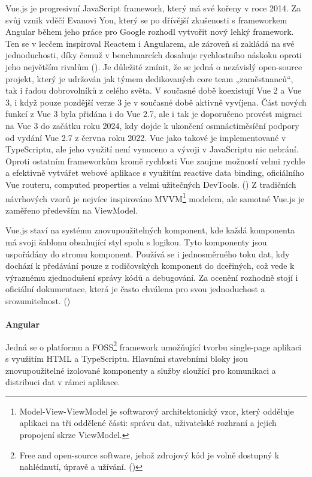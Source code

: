 \documentclass[twoside, 12pt]{article}
\begin{document}
Vue.js je progresivní JavaScript framework, který má své kořeny v roce 2014. Za svůj vznik vděčí Evanovi You, který se po dřívější zkušenosti s frameworkem Angular během jeho práce pro Google rozhodl vytvořit nový lehký framework. Ten se v lecčem inspiroval Reactem i Angularem, ale zároveň si zakládá na své jednoduchosti, díky čemuž v benchmarcích dosahuje rychlostního náskoku oproti jeho největším rivalům (\cite{VueRychlost}). Je důležité zmínit, že se jedná o nezávislý open-source projekt, který je udržován jak týmem dedikovaných core team „zaměstnanců“, tak i řadou dobrovolníků z celého světa. V současné době koexistují Vue 2 a Vue 3, i když pouze pozdější verze 3 je v současné době aktivně vyvíjena. Část nových funkcí z Vue 3 byla přidána i do Vue 2.7, ale i tak je doporučeno provést migraci na Vue 3 do začátku roku 2024, kdy dojde k ukončení osmnáctiměsíční podpory od vydání Vue 2.7 z června roku 2022. Vue jako takové je implementované v TypeScriptu, ale jeho využití není vynuceno a vývoji v JavaScriptu nic nebrání. Oproti ostatním frameworkům kromě rychlosti Vue zaujme možností velmi rychle a efektivně vytvářet webové aplikace s využitím reactive data binding, oficiálního Vue routeru, computed properties a velmi užitečných DevTools. (\cite{Shavin2023}) Z tradičních návrhových vzorů je nejvíce inspirováno MVVM\footnote{Model-View-ViewModel je softwarový architektonický vzor, který odděluje aplikaci na tři oddělené části: správu dat, uživatelské rozhraní a jejich propojení skrze ViewModel.} modelem, ale samotné Vue.js je zaměřeno především na ViewModel.

Vue.js staví na systému znovupoužitelných komponent, kde každá komponenta má svoji šablonu obsahující styl spolu s logikou. Tyto komponenty jsou uspořádány do stromu komponent. Používá se i jednosměrného toku dat, kdy dochází k předávání pouze z rodičovských komponent do dceřiných, což vede k výraznému zjednodušení správy kódů a debugování. Za ocenění rozhodně stojí i oficiální dokumentace, která je často chválena pro svou jednoduchost a srozumitelnost. (\cite{VueDokumentace})
\\
\\
\textbf{Angular}

Jedná se o platformu a FOSS\footnote{Free and open-source software, jehož zdrojový kód je volně dostupný k nahlédnutí, úpravě a užívání. (\cite{FOSS})} framework umožňující tvorbu single-page aplikaci s využitím HTML a TypeScriptu. Hlavními stavebními bloky jsou znovupoužitelné izolované komponenty a služby sloužící pro komunikaci a distribuci dat v rámci aplikace.
\end{document}
